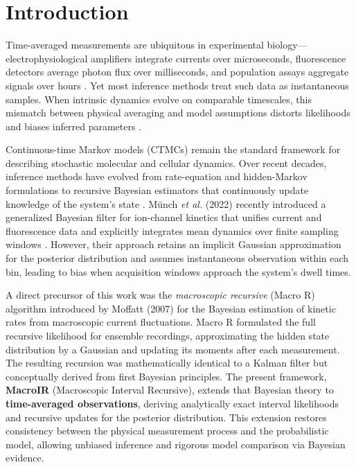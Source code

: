 \documentclass[9pt]{elife}
\begin{document}
	\section*{Introduction}
	
	Time-averaged measurements are ubiquitous in experimental biology—electrophysiological amplifiers integrate currents over microseconds, fluorescence detectors average photon flux over milliseconds, and population assays aggregate signals over hours \citep{Hille2001, Denk1990, Elowitz2002}. 
	Yet most inference methods treat such data as instantaneous samples. 
	When intrinsic dynamics evolve on comparable timescales, this mismatch between physical averaging and model assumptions distorts likelihoods and biases inferred parameters \citep{ColquhounHawkes1982, Qin2000, Munsky2009, Moffatt2007}.
	
	Continuous-time Markov models (CTMCs) remain the standard framework for describing stochastic molecular and cellular dynamics. 
	Over recent decades, inference methods have evolved from rate-equation and hidden-Markov formulations to recursive Bayesian estimators that continuously update knowledge of the system’s state \citep{Csanady2006, Siekmann2011, Bronson2013}.  
	Münch \emph{et al.} (2022) recently introduced a generalized Bayesian filter for ion-channel kinetics that unifies current and fluorescence data and explicitly integrates mean dynamics over finite sampling windows \citep{Munch2022}.  
	However, their approach retains an implicit Gaussian approximation for the posterior distribution and assumes instantaneous observation within each bin, leading to bias when acquisition windows approach the system’s dwell times.
	
	A direct precursor of this work was the \emph{macroscopic recursive} (Macro R) algorithm introduced by Moffatt (2007) for the Bayesian estimation of kinetic rates from macroscopic current fluctuations.  
	Macro R formulated the full recursive likelihood for ensemble recordings, approximating the hidden state distribution by a Gaussian and updating its moments after each measurement.  
	The resulting recursion was mathematically identical to a Kalman filter but conceptually derived from first Bayesian principles.  
	The present framework, \textbf{MacroIR} (Macroscopic Interval Recursive), extends that Bayesian theory to \textbf{time-averaged observations}, deriving analytically exact interval likelihoods and recursive updates for the posterior distribution.  
	This extension restores consistency between the physical measurement process and the probabilistic model, allowing unbiased inference and rigorous model comparison via Bayesian evidence.
	
\end{document}
